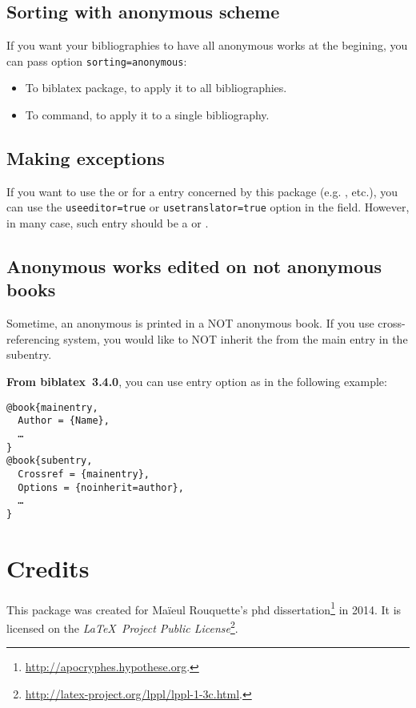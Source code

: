 \documentclass{ltxdockit}[2011/03/25]
\newcommand{\biblatex}{biblatex\xspace}
\begin{document}
\subsection{Sorting with anonymous scheme}

If you want your bibliographies to have all anonymous works at the begining, you can pass option \verb+sorting=anonymous+:

\begin{itemize}
	\item To \biblatex package, to apply it to all bibliographies.
	\item To  command, to apply it to a single bibliography.
\end{itemize}
\subsection{Making exceptions}

If you want to use the  or  for a entry concerned by this package (e.g. ,  etc.), you can use the \verb+useeditor=true+ or \verb+usetranslator=true+ 
option in the  field. However, in many case, such entry should be a  or . 

\subsection{Anonymous works edited on not anonymous books}\label{noinherit}

Sometime, an anonymous  is printed in a NOT anonymous book.
If you use cross-referencing system, you would like to NOT inherit the  from the main entry in the subentry.

\textbf{From \biblatex~3.4.0}, you can use entry option  as in the following example:

\begin{verbatim}
@book{mainentry,
  Author = {Name},
  …
}
@book{subentry,
  Crossref = {mainentry},
  Options = {noinherit=author},
  …
}
\end{verbatim}
\section{Credits}

This package was created for Maïeul Rouquette's phd dissertation\footnote{\url{http://apocryphes.hypothese.org}.} in 2014. It is licensed on the \emph{\LaTeX\ Project Public License}\footnote{\url{http://latex-project.org/lppl/lppl-1-3c.html}.}. 
\end{document}
